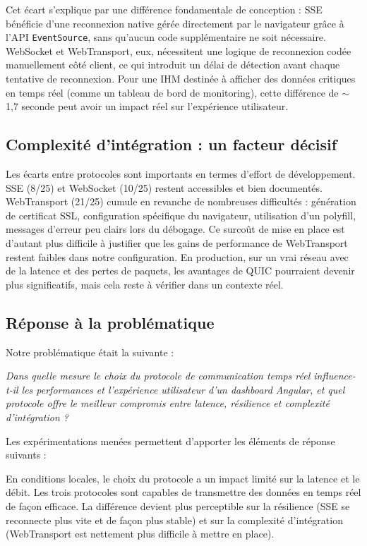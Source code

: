 Cet écart s'explique par une différence fondamentale de conception : SSE bénéficie d'une reconnexion native gérée directement par le navigateur grâce à l'API \texttt{EventSource}, sans qu'aucun code supplémentaire ne soit nécessaire. WebSocket et WebTransport, eux, nécessitent une logique de reconnexion codée manuellement côté client, ce qui introduit un délai de détection avant chaque tentative de reconnexion. Pour une IHM destinée à afficher des données critiques en temps réel (comme un tableau de bord de monitoring), cette différence de $\sim$1,7 seconde peut avoir un impact réel sur l'expérience utilisateur.

\subsection{Complexité d'intégration : un facteur décisif}

Les écarts entre protocoles sont importants en termes d'effort de développement. SSE (8/25) et WebSocket (10/25) restent accessibles et bien documentés. WebTransport (21/25) cumule en revanche de nombreuses difficultés : génération de certificat SSL, configuration spécifique du navigateur, utilisation d'un polyfill, messages d'erreur peu clairs lors du débogage. Ce surcoût de mise en place est d'autant plus difficile à justifier que les gains de performance de WebTransport restent faibles dans notre configuration. En production, sur un vrai réseau avec de la latence et des pertes de paquets, les avantages de QUIC pourraient devenir plus significatifs, mais cela reste à vérifier dans un contexte réel.

\subsection{Réponse à la problématique}

Notre problématique était la suivante :

\begin{center}
\textit{Dans quelle mesure le choix du protocole de communication temps réel influence-t-il les performances et l'expérience utilisateur d'un dashboard Angular, et quel protocole offre le meilleur compromis entre latence, résilience et complexité d'intégration ?}
\end{center}

Les expérimentations menées permettent d'apporter les éléments de réponse suivants :

En conditions locales, le choix du protocole a un impact limité sur la latence et le débit. Les trois protocoles sont capables de transmettre des données en temps réel de façon efficace. La différence devient plus perceptible sur la résilience (SSE se reconnecte plus vite et de façon plus stable) et sur la complexité d'intégration (WebTransport est nettement plus difficile à mettre en place).

